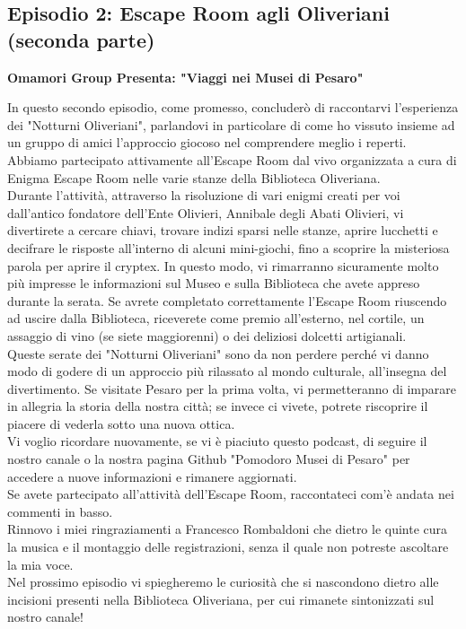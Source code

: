 \documentclass[hidelinks,12pt,a4paper]{article}
\begin{document}
\begin{flushleft}
		
		\subsection{Episodio 2: Escape Room agli Oliveriani (seconda parte)}
		\begin{center}
			\textbf{Omamori Group Presenta: "Viaggi nei Musei di Pesaro"}
		\end{center}
		In questo secondo episodio, come promesso, concluderò di raccontarvi l'esperienza dei "Notturni Oliveriani", parlandovi in particolare di come ho vissuto insieme ad un gruppo di amici l'approccio giocoso nel comprendere meglio i reperti. Abbiamo partecipato attivamente all'Escape Room dal vivo organizzata a cura di Enigma Escape Room nelle varie stanze della Biblioteca Oliveriana.\\
		Durante l'attività, attraverso la risoluzione di vari enigmi creati per voi dall'antico fondatore dell'Ente Olivieri, Annibale degli Abati Olivieri, vi divertirete a cercare chiavi, trovare indizi sparsi nelle stanze, aprire lucchetti e decifrare le risposte all'interno di alcuni mini-giochi, fino a scoprire la misteriosa parola per aprire il cryptex. In questo modo, vi rimarranno sicuramente molto più impresse le informazioni sul Museo e sulla Biblioteca che avete appreso durante la serata. Se avrete completato correttamente l'Escape Room riuscendo ad uscire dalla Biblioteca, riceverete come premio all'esterno, nel cortile, un assaggio di vino (se siete maggiorenni) o dei deliziosi dolcetti artigianali.\\
		Queste serate dei "Notturni Oliveriani" sono da non perdere perché vi danno modo di godere di un approccio più rilassato al mondo culturale, all'insegna del divertimento. Se visitate Pesaro per la prima volta, vi permetteranno di imparare in allegria la storia della nostra città; se invece ci vivete, potrete riscoprire il piacere di vederla sotto una nuova ottica.\\
		Vi voglio ricordare nuovamente, se vi è piaciuto questo podcast, di seguire il nostro canale o la nostra pagina Github "Pomodoro Musei di Pesaro" per accedere a nuove informazioni e rimanere aggiornati.\\
		Se avete partecipato all'attività dell'Escape Room, raccontateci com'è andata nei commenti in basso.\\
		Rinnovo i miei ringraziamenti a Francesco Rombaldoni che dietro le quinte cura la musica e il montaggio delle registrazioni, senza il quale non potreste ascoltare la mia voce.\\
		Nel prossimo episodio vi spiegheremo le curiosità che si nascondono dietro alle incisioni presenti nella Biblioteca Oliveriana, per cui rimanete sintonizzati sul nostro canale!\\
		

\end{flushleft}
\end{document}
